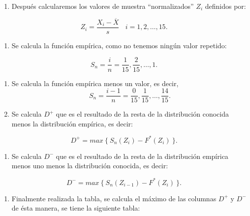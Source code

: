 \documentclass[
  a4paper,
  oneside,
  openany]{book}
\providecommand{\tightlist}{%
  \setlength{\itemsep}{0pt}\setlength{\parskip}{0pt}}
\begin{document}
\begin{enumerate}
\def\labelenumi{\arabic{enumi})}
\setcounter{enumi}{2}
\tightlist
\item
  Después calcularemos los valores de muestra ``normalizados'' \(Z_{i}\) definidos por:
\end{enumerate}

\[Z_{i}=\frac{X_{i}-\overline{X}}{s} \ \ \ \ i=1,2,\ldots,15.\]

\begin{enumerate}
\def\labelenumi{\arabic{enumi})}
\setcounter{enumi}{3}
\tightlist
\item
  Se calcula la función empírica, como no tenemos ningún valor repetido:
\end{enumerate}

\[S_{n}= \frac{i}{n}=\frac{1}{15},\frac{2}{15}, \ldots, 1. \]

\begin{enumerate}
\def\labelenumi{\arabic{enumi})}
\setcounter{enumi}{4}
\item
  Se calcula la función empírica menos un valor, es decir,
  \[S_{n}= \frac{i-1}{n}=\frac{0}{15},\frac{1}{15}, \ldots, \frac{14}{15}.\]
\item
  Se calcula \(D^+\) que es el resultado de la resta de la distribución conocida menos la distribución empírica, es decir:
\end{enumerate}

\[D^+= max\ \{ \ S_{n}(Z_{i})-F^*(Z_{i}) \ \}.\]

\begin{enumerate}
\def\labelenumi{\arabic{enumi})}
\setcounter{enumi}{6}
\tightlist
\item
  Se calcula \(D^-\) que es el resultado de la resta de la distribución empírica menos uno menos la distribución conocida, es decir:
\end{enumerate}

\[D^-= max\ \{\ S_{n}(Z_{i-1})-F^*(Z_{i}) \ \}.\]

\begin{enumerate}
\def\labelenumi{\arabic{enumi})}
\setcounter{enumi}{7}
\tightlist
\item
  Finalmente realizada la tabla, se calcula el máximo de las columnas \(D^+\) y \(D^-\) de ésta manera, se tiene la siguiente tabla:
\end{enumerate}
\end{document}
